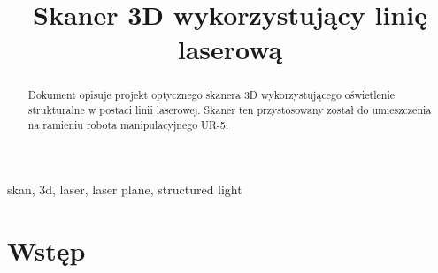 \documentclass[conference]{IEEEtran}
\begin{document}
\title{Skaner 3D wykorzystujący linię laserową\\}


\author{
\and
{}
\and
{}

}

\maketitle

\begin{abstract}
Dokument opisuje projekt optycznego skanera 3D wykorzystującego oświetlenie strukturalne w postaci linii laserowej. Skaner ten przystosowany został do umieszczenia na ramieniu robota manipulacyjnego UR-5.

\end{abstract}

\begin{IEEEkeywords}
skan, 3d, laser, laser plane, structured light
\end{IEEEkeywords}

\section{Wstęp}
\end{document}
